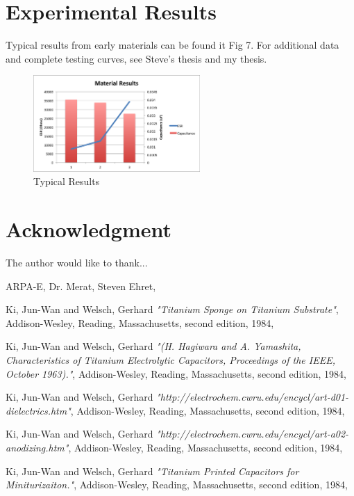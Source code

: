 \documentclass[journal]{IEEEtran}
\begin{document}
\section{Experimental Results}
Typical results from early materials can be found it Fig 7. For additional data and complete testing curves, see Steve’s thesis and my thesis.

\begin{figure}[here]
\centering
\includegraphics[width=2.5in]{materialResults}
\caption{Typical Results}
\label{fig:materialResults}
\end{figure}

\section*{Acknowledgment}

The author would like to thank...

ARPA-E,
Dr. Merat,
Steven Ehret,

\ifCLASSOPTIONcaptionsoff
  \newpage
\fi


%
\begin{thebibliography}{1}

 Ki, Jun-Wan and Welsch, Gerhard \emph{"Titanium Sponge on Titanium Substrate"}, Addison-Wesley, Reading,
Massachusetts, second edition, 1984,

 Ki, Jun-Wan and Welsch, Gerhard \emph{"(H. Hagiwara and A. Yamashita, Characteristics of Titanium Electrolytic Capacitors, Proceedings of the IEEE, October 1963)."}, Addison-Wesley, Reading,
Massachusetts, second edition, 1984,

 Ki, Jun-Wan and Welsch, Gerhard \emph{"http://electrochem.cwru.edu/encycl/art-d01-dielectrics.htm"}, Addison-Wesley, Reading,
Massachusetts, second edition, 1984,

 Ki, Jun-Wan and Welsch, Gerhard \emph{"http://electrochem.cwru.edu/encycl/art-a02-anodizing.htm"}, Addison-Wesley, Reading,
Massachusetts, second edition, 1984,

 Ki, Jun-Wan and Welsch, Gerhard \emph{"Titanium Printed Capacitors for Miniturizaiton."}, Addison-Wesley, Reading,
Massachusetts, second edition, 1984,

\end{thebibliography}
\end{document}
